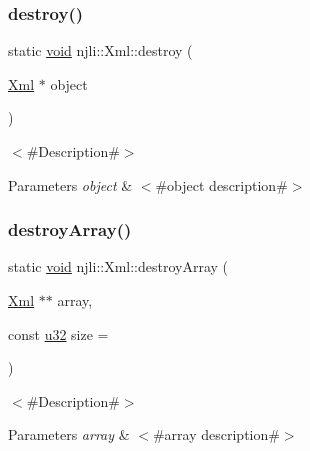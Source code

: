 \subsubsection{\texorpdfstring{destroy()}{destroy()}}
{\footnotesize\ttfamily static \mbox{\hyperlink{_thread_8h_af1e856da2e658414cb2456cb6f7ebc66}{void}} njli\+::\+Xml\+::destroy (\begin{DoxyParamCaption}\item[{\mbox{\hyperlink{classnjli_1_1_xml}{Xml}} $\ast$}]{object }\end{DoxyParamCaption})\hspace{0.3cm}{\ttfamily [static]}}

$<$\#\+Description\#$>$


\begin{DoxyParams}{Parameters}
{\em object} & $<$\#object description\#$>$ \\
\hline
\end{DoxyParams}
\mbox{\label{classnjli_1_1_xml_aee3fb8e0b6eb5c7c9d520713d54756c0}} 
\subsubsection{\texorpdfstring{destroy\+Array()}{destroyArray()}}
{\footnotesize\ttfamily static \mbox{\hyperlink{_thread_8h_af1e856da2e658414cb2456cb6f7ebc66}{void}} njli\+::\+Xml\+::destroy\+Array (\begin{DoxyParamCaption}\item[{\mbox{\hyperlink{classnjli_1_1_xml}{Xml}} $\ast$$\ast$}]{array,  }\item[{const \mbox{\hyperlink{_util_8h_a10e94b422ef0c20dcdec20d31a1f5049}{u32}}}]{size = {} }\end{DoxyParamCaption})\hspace{0.3cm}{\ttfamily [static]}}

$<$\#\+Description\#$>$


\begin{DoxyParams}{Parameters}
{\em array} & $<$\#array description\#$>$ \\
\hline
\end{DoxyParams}
\mbox{\label{classnjli_1_1_xml_abc7ce0d0b196b029860dc0ef23b452ac}} 

